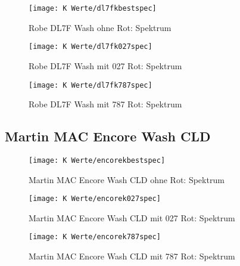 \documentclass[pagesize,paper=A4,fontsize=12pt,utf8,numbers=noenddot,bibliography=totoc,listof=totoc,DIV=11,BCOR=1mm]{scrreprt}
\begin{document}
\begin{figure}[htp]     %
\centering
\texttt{[image: K Werte/dl7fkbestspec]} 
\caption { Robe DL7F Wash ohne Rot: Spektrum} 
\end{figure}

\begin{figure}[htp]     %
\centering
\texttt{[image: K Werte/dl7fk027spec]} 
\caption { Robe DL7F Wash mit 027 Rot: Spektrum} 
\end{figure}

\begin{figure}[htp]     %
\centering
\texttt{[image: K Werte/dl7fk787spec]} 
\caption { Robe DL7F Wash mit 787 Rot: Spektrum} 
\end{figure}


\subsection{Martin MAC Encore Wash CLD}

\begin{figure}[htp]     %
\centering
\texttt{[image: K Werte/encorekbestspec]} 
\caption {Martin MAC Encore Wash CLD ohne Rot: Spektrum} 
\end{figure}

\begin{figure}[htp]     %
\centering
\texttt{[image: K Werte/encorek027spec]} 
\caption {Martin MAC Encore Wash CLD mit 027 Rot: Spektrum} 
\end{figure}

\begin{figure}[htp]     %
\centering
\texttt{[image: K Werte/encorek787spec]} 
\caption {Martin MAC Encore Wash CLD mit 787 Rot: Spektrum} 
\end{figure}
\end{document}
